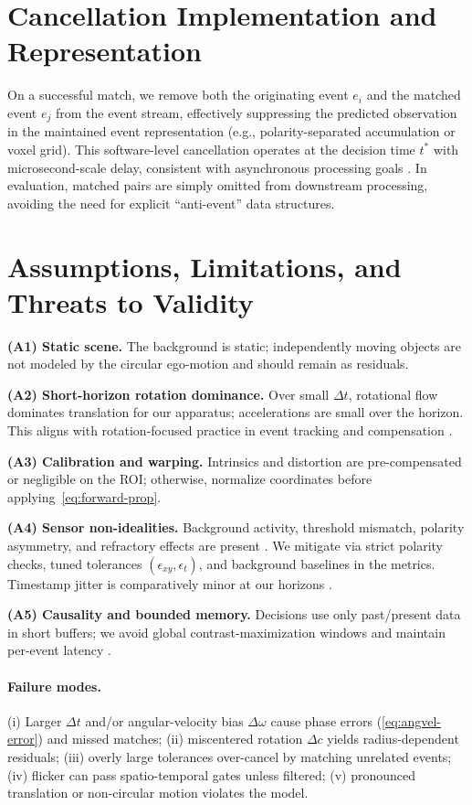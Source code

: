 \section{Cancellation Implementation and Representation}
On a successful match, we remove both the originating event $e_i$ and the matched event $e_j$ from the event stream, effectively suppressing the predicted observation in the maintained event representation (e.g., polarity-separated accumulation or voxel grid). This software-level cancellation operates at the decision time $t^*$ with microsecond-scale delay, consistent with asynchronous processing goals \cite{Gallego2018CMax,Bardow2016SOFIE}. In evaluation, matched pairs are simply omitted from downstream processing, avoiding the need for explicit ``anti-event'' data structures.

\section{Assumptions, Limitations, and Threats to Validity}
\label{sec:assumptions}
\textbf{(A1) Static scene.} The background is static; independently moving objects are not modeled by the circular ego-motion and should remain as residuals.

\textbf{(A2) Short-horizon rotation dominance.} Over small $\Delta t$, rotational flow dominates translation for our apparatus; accelerations are small over the horizon. This aligns with rotation-focused practice in event tracking and compensation \cite{Gallego2017Angular,Gallego2018CMax}.

\textbf{(A3) Calibration and warping.} Intrinsics and distortion are pre-compensated or negligible on the ROI; otherwise, normalize coordinates before applying~\eqref{eq:forward-prop}.

\textbf{(A4) Sensor non-idealities.} Background activity, threshold mismatch, polarity asymmetry, and refractory effects are present \cite{Brandli2014DAVIS,Delbruck2020Handbook,Gallego2020Survey}. We mitigate via strict polarity checks, tuned tolerances $(\epsilon_{xy},\epsilon_t)$, and background baselines in the metrics. Timestamp jitter is comparatively minor at our horizons \cite{Wang2025Thesis}.

\textbf{(A5) Causality and bounded memory.} Decisions use only past/present data in short buffers; we avoid global contrast-maximization windows and maintain per-event latency \cite{Bardow2016SOFIE,Gallego2018CMax}.

\paragraph{Failure modes.}
(i) Larger $\Delta t$ and/or angular-velocity bias $\Delta\omega$ cause phase errors (\ref{eq:angvel-error}) and missed matches; (ii) miscentered rotation $\Delta c$ yields radius-dependent residuals; (iii) overly large tolerances over-cancel by matching unrelated events; (iv) flicker can pass spatio-temporal gates unless filtered; (v) pronounced translation or non-circular motion violates the model.


